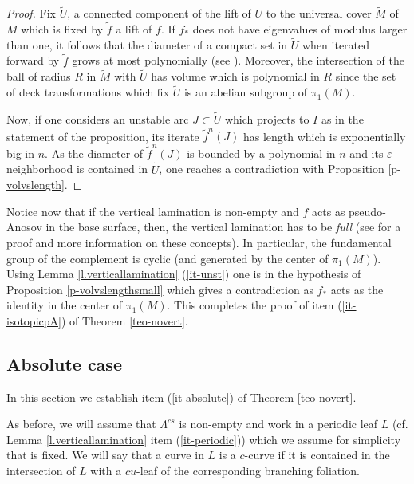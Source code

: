 \documentclass[11pt]{amsart} %
\newcommand{\eps}{\varepsilon}
\numberwithin{equation}{section}
\theoremstyle{remark}
\begin{document}
\begin{proof}
Fix $\tilde U$, a connected component of the lift of $U$ to the universal cover $\tilde M$ of $M$ which is fixed by $\tilde f$ a lift of $f$. If $f_\ast$ does not have eigenvalues of modulus larger than one, it follows that the diameter of a compact set in $\tilde U$ when iterated forward by $\tilde f$ grows at most polynomially (see \cite[Section 2]{BI}). Moreover, the intersection of the ball of radius $R$ in $\tilde M$ with $\tilde U$ has volume which is polynomial in $R$ since the set of deck transformations which fix $\tilde U$ is an abelian subgroup of $\pi_1(M)$. 

Now, if one considers an unstable arc $J \subset \tilde U$  which projects to $I$ as in the statement of the proposition, its iterate $\tilde f^n(J)$ has length which is exponentially big in $n$. As the diameter of $\tilde f^n(J)$ is bounded by a polynomial in $n$ and its $\eps$-neighborhood is contained in $\tilde U$, one reaches a contradiction with Proposition \ref{p-volvslength}. 
\end{proof}

Notice now that if the vertical lamination is non-empty and $f$ acts as pseudo-Anosov in the base surface, then, the vertical lamination has to be \emph{full} (see \cite[Chapter 1]{Calegari} for a proof and more information on these concepts). In particular, the fundamental group of the complement is cyclic (and generated by the center of $\pi_1(M)$). Using Lemma \ref{l.verticallamination} (\ref{it-unst}) one is in the hypothesis of Proposition \ref{p-volvslengthsmall} which gives a contradiction as $f_\ast$ acts as the identity in the center of $\pi_1(M)$. This completes the proof of item (\ref{it-isotopicpA}) of Theorem \ref{teo-novert}. 




\subsection{Absolute case}\label{ss.absolute}
In this section we establish item (\ref{it-absolute}) of Theorem \ref{teo-novert}. 

As before, we will assume that  $\Lambda^{cs}$ is non-empty and work in a periodic leaf $L$ (cf. Lemma \ref{l.verticallamination} item (\ref{it-periodic})) which we assume for simplicity that is fixed. We will say that a curve in $L$ is a $c$-curve if it is contained in the intersection of $L$ with a $cu$-leaf of the corresponding branching foliation. 
\end{document}
